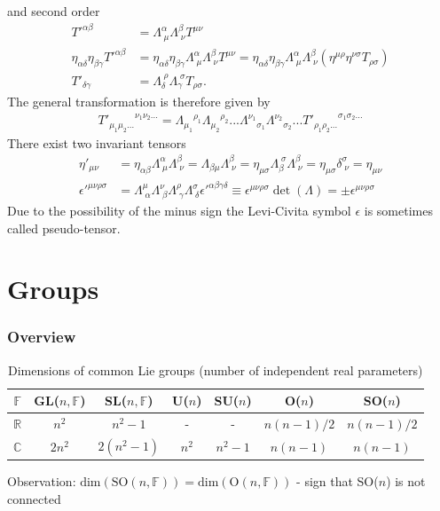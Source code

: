 \documentclass[10pt,a4paper]{book}
\theoremstyle{definition}
\begin{document}
and second order
\begin{align}
    T'^{\alpha\beta}&=\Lambda^\alpha_{\;\mu}\Lambda^\beta_{\;\nu}T^{\mu\nu}\\
    \eta_{\alpha\delta}\eta_{\beta\gamma}T'^{\alpha\beta}&=\eta_{\alpha\delta}\eta_{\beta\gamma}\Lambda^\alpha_{\;\mu}\Lambda^\beta_{\;\nu}T^{\mu\nu}=\eta_{\alpha\delta}\eta_{\beta\gamma}\Lambda^\alpha_{\;\mu}\Lambda^\beta_{\;\nu}(\eta^{\mu\rho}\eta^{\nu\sigma} T_{\rho\sigma})\\
    T'_{\delta\gamma}&=\Lambda_\delta^{\;\rho}\Lambda_\gamma^{\;\sigma}T_{\rho\sigma}.
\end{align}
The general transformation is therefore given by
\begin{align}
    {T'_{\mu_1\mu_2...}}^{\nu_1\nu_2...}={\Lambda_{\mu_1}}^{\rho_1}{\Lambda_{\mu_2}}^{\rho_2}... {\Lambda^{\nu_1}}_{\sigma_1}{\Lambda^{\nu_2}}_{\sigma_2}... {T'_{\rho_1\rho_2...}}^{\sigma_1\sigma_2...}
\end{align}
There exist two invariant tensors
\begin{align}
    \eta'_{\mu\nu} 
    &=\eta_{\alpha\beta}\Lambda^\alpha_{\;\mu} \Lambda^\beta_{\;\nu}
    =\Lambda_{\beta\mu} \Lambda^\beta_{\;\nu}
    =\eta_{\mu\sigma}\Lambda_{\beta}^{\;\sigma} \Lambda^\beta_{\;\nu}
    =\eta_{\mu\sigma}\delta^\sigma_{\;\nu}
    =\eta_{\mu\nu}\\
    {\epsilon'}^{\mu\nu\rho\sigma}
    &=\Lambda^\mu_{\;\alpha}\Lambda^\nu_{\;\beta}\Lambda^\rho_{\;\gamma}\Lambda^\sigma_{\;\delta}{\epsilon'}^{\alpha\beta\gamma\delta}\equiv \epsilon^{\mu\nu\rho\sigma} \det(\Lambda)=\pm \epsilon^{\mu\nu\rho\sigma}
\end{align}
Due to the possibility of the minus sign the Levi-Civita symbol $\epsilon$ is sometimes called pseudo-tensor.

\chapter{Groups}
\subsection{Overview}
\begin{table}[!h]
    \centering
    \begin{tabular}{c | c c c c c c}
        $\mathbb{F}$    & GL($n,\mathbb{F}$)    & SL($n,\mathbb{F}$) & U($n$) & SU($n$) & O($n$)     & SO($n$)     \\ \hline\hline
        $\mathbb{R}$    & $n^2$                 & $n^2-1$            & -      & -       & $n(n-1)/2$ & $n(n-1)/2$  \\
        $\mathbb{C}$    & $2n^2$                & $2(n^2-1)$         & $n^2$  & $n^2-1$ & $n(n-1)$   & $n(n-1)$    \\
    \end{tabular}
    \caption{Dimensions of common Lie groups (number of independent real parameters)}
    \label{tab:my_label}
\end{table}
Observation: $\text{dim}(\text{SO}(n,\mathbb{F}))=\text{dim}(\text{O}(n,\mathbb{F}))$  - sign that SO($n$) is not connected
\end{document}

